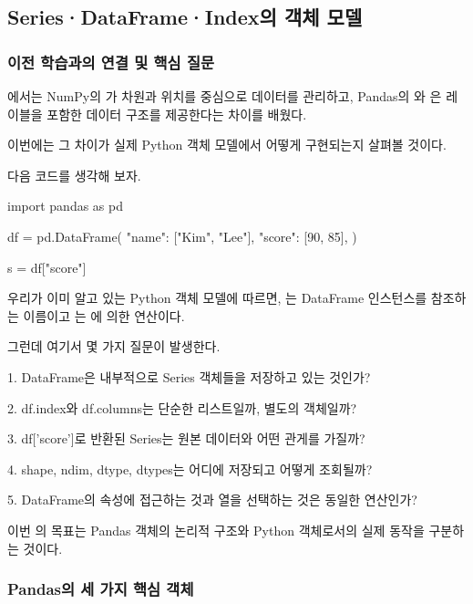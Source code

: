 

\subsection{Series·DataFrame·Index의 객체 모델}

\subsubsection{이전 학습과의 연결 및 핵심 질문}

에서는 NumPy의 가 차원과 위치를 중심으로 데이터를 관리하고, Pandas의 와 은 레이블을 포함한 데이터 구조를 제공한다는 차이를 배웠다.

이번에는 그 차이가 실제 Python 객체 모델에서 어떻게 구현되는지 살펴볼 것이다.

다음 코드를 생각해 보자.

\begin{dhkcode}
import pandas as pd

df = pd.DataFrame({
    "name": ["Kim", "Lee"],
    "score": [90, 85],
})

s = df["score"]
\end{dhkcode}

우리가 이미 알고 있는 Python 객체 모델에 따르면, 는 DataFrame 인스턴스를 참조하는 이름이고 는 에 의한 연산이다.

그런데 여기서 몇 가지 질문이 발생한다.

\begin{dhksmry}
1. DataFrame은 내부적으로 Series 객체들을 저장하고 있는 것인가?

2. df.index와 df.columns는 단순한 리스트일까, 별도의 객체일까?

3. df['score']로 반환된 Series는 원본 데이터와 어떤 관게를 가질까?

4. shape, ndim, dtype, dtypes는 어디에 저장되고 어떻게 조회될까?

5. DataFrame의 속성에 접근하는 것과 열을 선택하는 것은 동일한 연산인가?
\end{dhksmry}

이번 의 목표는 Pandas 객체의 논리적 구조와 Python 객체로서의 실제 동작을 구분하는 것이다.

\subsubsection{Pandas의 세 가지 핵심 객체}

